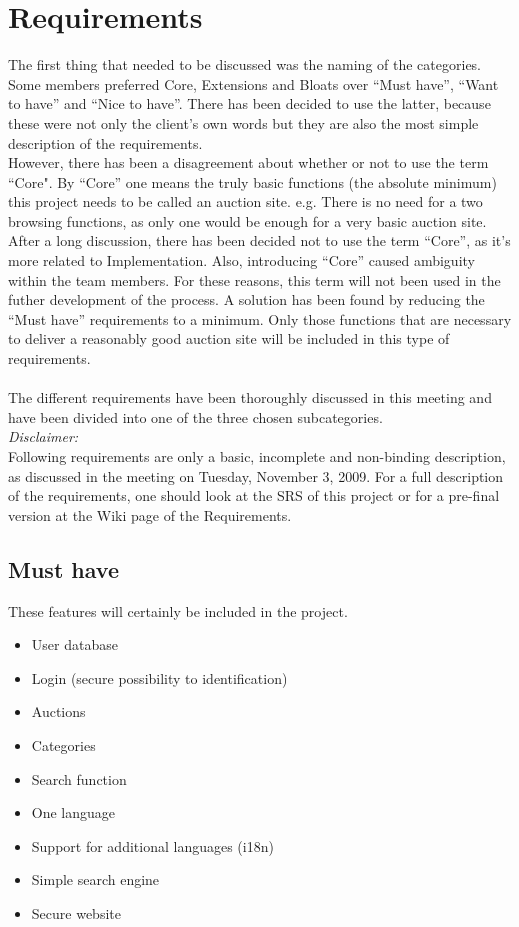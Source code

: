 \documentclass[a4paper, 12pt]{article}
\begin{document}
	\section{Requirements}
The first thing that needed to be discussed was the naming of the categories. Some members preferred Core, Extensions and Bloats over ``Must have'', ``Want to have'' and ``Nice to have''. There has been decided to use the latter, because these were not only the client's own words but they are also the most simple description of the requirements.\\However, there has been a disagreement about whether or not to use the term ``Core". By ``Core'' one means the truly basic functions (the absolute minimum) this project needs to be called an auction site. e.g. There is no need for a two browsing functions, as only one would be enough for a very basic auction site. After a long discussion, there has been decided not to use the term ``Core'', as it's more related to Implementation. Also, introducing ``Core'' caused ambiguity within the team members. For these reasons, this term will not been used in the futher development of the process. A solution has been found by reducing the ``Must have'' requirements to a minimum. Only those functions that are necessary to  deliver a reasonably good auction site will be included in this type of requirements.
\\ \\
The different requirements have been thoroughly discussed in this meeting and have been divided into one of the three chosen subcategories.\\ \textit{Disclaimer:}\\
Following requirements are only a basic, incomplete and non-binding description, as discussed in the meeting on Tuesday, November 3, 2009. For a full description of the requirements, one should look at the SRS of this project or for a pre-final version at the Wiki page of the Requirements\cite{site1}.

		\subsection{Must have}
These features will certainly be included in the project.
			\begin{itemize}
				\item User database
				\item Login (secure possibility to identification)
				\item Auctions
				\item Categories
				\item Search function
				\item One language
				\item Support for additional languages (i18n)
				\item Simple search engine
				\item Secure website
			\end{itemize}
	
\end{document}
